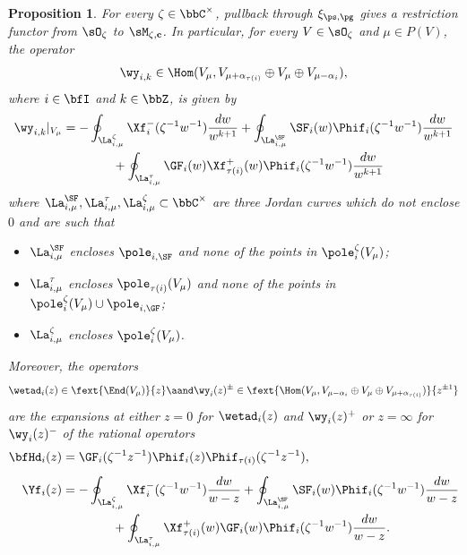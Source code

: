 \documentclass[reqno]{amsart}
\numberwithin{equation}{section}
\newtheorem*{proposition}{Proposition}
\begin{document}
\begin{proposition}\label{prop:restriction}
For every $\zeta\in\bbC^\times$, pullback through $\xi_{\ps,\pg}$ gives a
restriction functor from $\sO_\zeta$ to $\sM_{\zeta,\mathbf c}$. In particular, for every $V\in\sO_\zeta$
and $\mu\in P(V)$, the operator
\[\wy_{i,k}\in{\Hom(V_{\mu}, V_{\mu+\alpha_{\tau(i)}}\oplus V_\mu\oplus V_{\mu-\alpha_i})},\] 
where $i\in\bfI$ and $k\in\bbZ$,
is given by
	\begin{align}
		\wy_{i,k}\vert_{V_{\mu}}
		&=-\oint_{\La_{i,\mu}^\zeta}\Xf^-_{i}(\zeta^{-1}w^{-1})\frac{dw}{w^{k+1}}
		+\oint_{\La_{i,\mu}^{\SF}}\SF_i(w)\Phif_i(\zeta^{-1}w^{-1})\frac{dw}{w^{k+1}}\\
	&\qquad\qquad+\oint_{\La_{i,\mu}^\tau}\GF_i(w)\Xf_{\tau(i)}^+(w)\Phif_i(\zeta^{-1}w^{-1})\frac{dw}{w^{k+1}}
\end{align}
where
$\La^\SF_{i,\mu}, \La^\tau_{i,\mu},\La^\zeta_{i,\mu}\subset\bbC^\times$ are three Jordan curves which do not enclose $0$ and are such that
\begin{itemize}\itemsep0.25cm
	\item $\La^\SF_{i,\mu}$ encloses $\pole_{i,\SF}$ and none of the points in $\pole_i^\zeta(V_\mu)$;
	\item $\La^\tau_{i,\mu}$ encloses $\pole_{\tau(i)}(V_\mu)$ and none of the points in $\pole_i^\zeta(V_\mu)\cup\pole_{i,\GF}$;
		\item $\La^\zeta_{i,\mu}$ encloses $\pole_i^\zeta(V_\mu)$.
\end{itemize}
Moreover, the operators
\begin{equation}
	\wetad_i(z)\in\fext{\End(V_\mu)}{z}
	\aand
	\wy_i(z)^\pm\in\fext{\Hom(V_\mu, V_{\mu-\alpha_i}\oplus V_\mu\oplus V_{\mu+\alpha_{\tau(i)}})}{z^{\pm1}}
\end{equation}
are the expansions at either $z=0$ for $\wetad_i(z)$ and $\wy_i(z)^+$ or $z=\infty$ for $\wy_i(z)^-$ of the rational operators
\begin{align}
	\bfHd_i(z)&=\GF_i(\zeta^{-1}z^{-1})\Phif_i(z)\Phif_{\tau(i)}(\zeta^{-1}z^{-1}),\\[0.5em]
		\Yf_i(z)&=-\oint_{\La_{i,\mu}^\zeta}\Xf^-_{i}(\zeta^{-1}w^{-1})\frac{dw}{w-z}
	+\oint_{\La_{i,\mu}^\SF}\SF_i(w)\Phif_i(\zeta^{-1}w^{-1})\frac{dw}{w-z}\\
	&\qquad\qquad+\oint_{\La_{i,\mu}^{\tau}}\Xf_{\tau(i)}^+(w)\GF_i(w)\Phif_i(\zeta^{-1}w^{-1})\frac{dw}{w-z}.
\end{align}	
\end{proposition}
\end{document}
